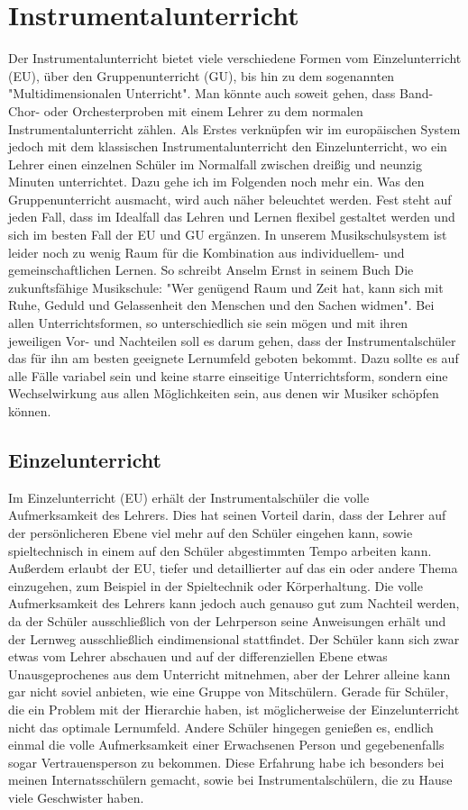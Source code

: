 \section{Instrumentalunterricht}
Der Instrumentalunterricht bietet viele verschiedene Formen vom Einzelunterricht
(EU), über den Gruppenunterricht (GU), bis hin zu dem sogenannten
"Multidimensionalen Unterricht". Man könnte auch soweit gehen, dass Band- Chor-
oder Orchesterproben mit einem Lehrer zu dem normalen Instrumentalunterricht
zählen. Als Erstes verknüpfen wir im europäischen System jedoch mit dem
klassischen Instrumentalunterricht den Einzelunterricht, wo ein Lehrer einen
einzelnen Schüler im Normalfall zwischen dreißig und neunzig Minuten
unterrichtet. Dazu gehe ich im Folgenden noch mehr ein. Was den
Gruppenunterricht ausmacht, wird auch näher beleuchtet werden. Fest steht auf
jeden Fall, dass im Idealfall das Lehren und Lernen flexibel gestaltet werden
und sich im besten Fall der EU und GU ergänzen. In unserem Musikschulsystem ist
leider noch zu wenig Raum für die Kombination aus individuellem- und
gemeinschaftlichen Lernen. So schreibt Anselm Ernst in seinem Buch Die
zukunftsfähige Musikschule: "Wer genügend Raum und Zeit hat, kann sich mit Ruhe,
Geduld und Gelassenheit den Menschen und den Sachen widmen".
\autocite[84]{ernst:die_zukunftsfaehige_musikschule} Bei allen
Unterrichtsformen, so unterschiedlich sie sein mögen und mit ihren jeweiligen
Vor- und Nachteilen soll es darum gehen, dass der Instrumentalschüler das für
ihn am besten geeignete Lernumfeld geboten bekommt. Dazu sollte es auf alle
Fälle variabel sein und keine starre einseitige Unterrichtsform, sondern eine
Wechselwirkung aus allen Möglichkeiten sein, aus denen wir Musiker schöpfen
können. 


\subsection{Einzelunterricht}
Im Einzelunterricht (EU) erhält der Instrumentalschüler die volle Aufmerksamkeit
des Lehrers. Dies hat seinen Vorteil darin, dass der Lehrer auf der
persönlicheren Ebene viel mehr auf den Schüler eingehen kann, sowie
spieltechnisch in einem auf den Schüler abgestimmten Tempo arbeiten kann.
Außerdem erlaubt der EU, tiefer und detaillierter auf das ein oder andere Thema
einzugehen, zum Beispiel in der Spieltechnik oder Körperhaltung. Die volle
Aufmerksamkeit des Lehrers kann jedoch auch genauso gut zum Nachteil werden, da
der Schüler ausschließlich von der Lehrperson seine Anweisungen erhält und der
Lernweg ausschließlich eindimensional stattfindet. Der Schüler kann sich zwar
etwas vom Lehrer abschauen und auf der differenziellen Ebene etwas
Unausgeprochenes aus dem Unterricht mitnehmen, aber der Lehrer alleine kann gar
nicht soviel anbieten, wie eine Gruppe von Mitschülern. Gerade für Schüler, die
ein Problem mit der Hierarchie haben, ist möglicherweise der Einzelunterricht
nicht das optimale Lernumfeld. Andere Schüler hingegen genießen es, endlich
einmal die volle Aufmerksamkeit einer Erwachsenen Person und gegebenenfalls
sogar Vertrauensperson zu bekommen. Diese Erfahrung habe ich besonders bei
meinen Internatsschülern gemacht, sowie bei Instrumentalschülern, die zu Hause
viele Geschwister haben. 

